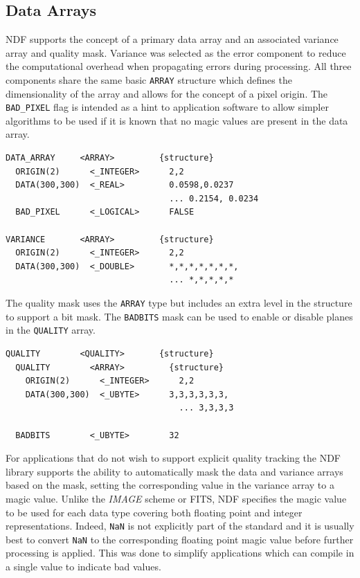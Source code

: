 \documentclass[final,authoryear,5p,times,twocolumn]{elsarticle}
\begin{document}
\subsection{Data Arrays}

NDF supports the concept of a primary data array and an associated
variance array and quality mask. Variance was selected as the error
component to reduce the computational overhead when propagating errors
during processing. All three components share the same
basic \texttt{ARRAY} structure which defines the dimensionality of the
array and allows for the concept of a pixel origin. The
\texttt{BAD\_PIXEL} flag is intended as a hint to application
software to allow simpler algorithms to be used if it is known
that no magic values are present in the data array.

{\small
\begin{verbatim}
DATA_ARRAY     <ARRAY>         {structure}
  ORIGIN(2)      <_INTEGER>      2,2
  DATA(300,300)  <_REAL>         0.0598,0.0237
                                 ... 0.2154, 0.0234
  BAD_PIXEL      <_LOGICAL>      FALSE

VARIANCE       <ARRAY>         {structure}
  ORIGIN(2)      <_INTEGER>      2,2
  DATA(300,300)  <_DOUBLE>       *,*,*,*,*,*,*,
                                 ... *,*,*,*,*
\end{verbatim}
}

The quality mask uses the \texttt{ARRAY} type but includes an extra
level in the structure to support a bit mask. The \texttt{BADBITS}
mask can be used to enable or disable planes in the \texttt{QUALITY} array.

{\small
\begin{verbatim}
QUALITY        <QUALITY>       {structure}
  QUALITY        <ARRAY>         {structure}
    ORIGIN(2)      <_INTEGER>      2,2
    DATA(300,300)  <_UBYTE>      3,3,3,3,3,3,
                                   ... 3,3,3,3

  BADBITS        <_UBYTE>        32
\end{verbatim}
}

For applications that do not wish to support explicit quality tracking
the NDF library supports the ability to automatically mask the data
and variance arrays based on the mask, setting the corresponding value
in the variance array to a magic value. Unlike the \emph{IMAGE} scheme
or FITS, NDF specifies the magic value to be used for each data type
covering both floating point and integer representations. Indeed,
\texttt{NaN} is not explicitly part of the standard and it is usually
best to convert \texttt{NaN} to the corresponding floating point magic
value before further processing is applied. This was done to simplify
applications which can compile in a single value to indicate bad
values.
\end{document}
